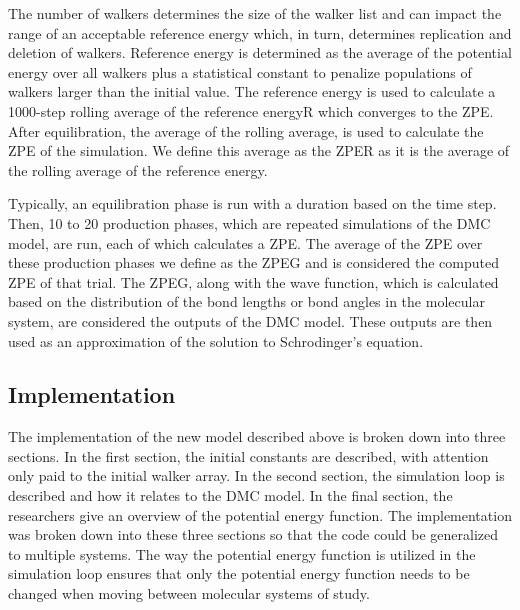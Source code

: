 \documentclass[journal=jacsat,manuscript=article]{achemso}
\begin{document}
The number of walkers determines the size of the walker list and can impact the range of an acceptable reference energy which, in turn, determines replication and deletion of walkers. Reference energy is determined as the average of the potential energy over all walkers plus a statistical constant to penalize populations of walkers larger than the initial value. The reference energy is used to calculate a 1000-step rolling average of the reference energyR which converges to the ZPE. After equilibration, the average of the rolling average, is used to calculate the ZPE of the simulation. We define this average as the ZPER as it is the average of the rolling average of the reference energy. 

Typically, an equilibration phase is run with a duration based on the time step. Then, 10 to 20 production phases, which are repeated simulations of the DMC model, are run, each of which calculates a ZPE. The average of the ZPE over these production phases we define as the ZPEG and is considered the computed ZPE of that trial. The ZPEG, along with the wave function, which is calculated based on the distribution of the bond lengths or bond angles in the molecular system, are considered the outputs of the DMC model. These outputs are then used as an approximation of the solution to Schrodinger’s equation.

\subsection{Implementation}
The implementation of the new model described above is broken down into three sections. In the first section, the initial constants are described, with attention only paid to the initial walker array. In the second section, the simulation loop is described and how it relates to the DMC model. In the final section, the researchers give an overview of the potential energy function. The implementation was broken down into these three sections so that the code could be generalized to multiple systems. The way the potential energy function is utilized in the simulation loop ensures that only the potential energy function needs to be changed when moving between molecular systems of study. 
\end{document}

